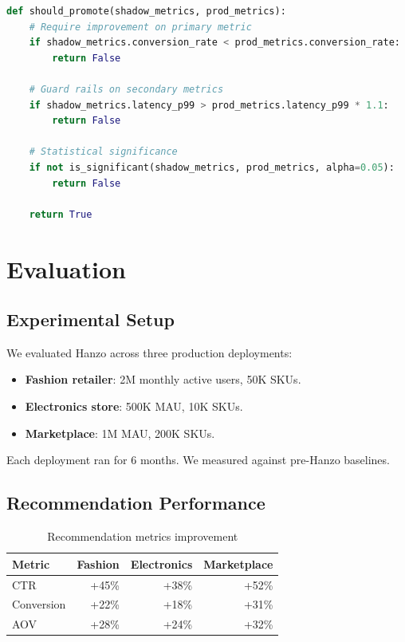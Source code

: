 \documentclass[11pt,twocolumn]{article}
\begin{document}
\begin{lstlisting}[language=Python,caption=Model promotion logic]
def should_promote(shadow_metrics, prod_metrics):
    # Require improvement on primary metric
    if shadow_metrics.conversion_rate < prod_metrics.conversion_rate:
        return False

    # Guard rails on secondary metrics
    if shadow_metrics.latency_p99 > prod_metrics.latency_p99 * 1.1:
        return False

    # Statistical significance
    if not is_significant(shadow_metrics, prod_metrics, alpha=0.05):
        return False

    return True
\end{lstlisting}

\section{Evaluation}

\subsection{Experimental Setup}

We evaluated Hanzo across three production deployments:

\begin{itemize}
\item \textbf{Fashion retailer}: 2M monthly active users, 50K SKUs.
\item \textbf{Electronics store}: 500K MAU, 10K SKUs.
\item \textbf{Marketplace}: 1M MAU, 200K SKUs.
\end{itemize}

Each deployment ran for 6 months. We measured against pre-Hanzo baselines.

\subsection{Recommendation Performance}

\begin{table}[h]
\centering
\caption{Recommendation metrics improvement}
\label{tab:reco}
\begin{tabular}{lrrr}
\hline
Metric & Fashion & Electronics & Marketplace \\
\hline
CTR & +45\% & +38\% & +52\% \\
Conversion & +22\% & +18\% & +31\% \\
AOV & +28\% & +24\% & +32\% \\
\hline
\end{tabular}
\end{table}
\end{document}
